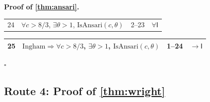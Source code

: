 \documentclass[11pt,reqno]{amsart}
\theoremstyle{blueplain}
\renewcommand{\qedsymbol}{\textcolor{proofqed}{\ensuremath{\square}}}
\renewenvironment{proof}[1][Proof]{\par\noindent\textbf{\textcolor{proofhead}{#1.}}\par\nobreak}{\par\nobreak\hfill\qedsymbol}
\numberwithin{equation}{section}
\begin{document}
\begin{proof}[\textbf{Proof of \cref{thm:ansari}}]
{\begin{tabular}{|m{0.7cm}|m{12cm}|m{1.4cm}|m{2.5cm}|}
24 & $\forall c>8/3$, $\exists\theta>1$, $\mathrm{IsAnsari}(c,\theta)$ & 2--23 & $\forall\mathsf{I}$ \\
\end{tabular}%
\noindent \newline
\noindent
\begin{tabular}{|m{0.7cm}|m{12cm}|m{1.4cm}|m{2.5cm}|}
\hline
25 & $\text{Ingham}\Rightarrow\forall c>8/3$, $\exists\theta>1$, $\mathrm{IsAnsari}(c,\theta)$ & 1--24 & $\rightarrow\mathsf{I}$ \\ \hline
\end{tabular}%
}
\end{proof}

\subsection{Route 4: Proof of \cref{thm:wright}}
\end{document}
